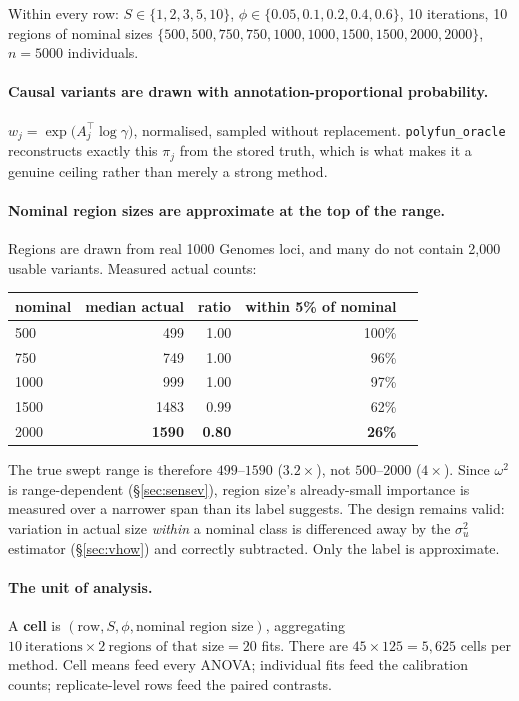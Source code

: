 \documentclass[11pt,a4paper]{article}
\begin{document}
Within every row: $S\in\{1,2,3,5,10\}$, $\phi\in\{0.05,0.1,0.2,0.4,0.6\}$,
10 iterations, 10 regions of nominal sizes
$\{500,500,750,750,1000,1000,1500,1500,2000,2000\}$, $n=5000$ individuals.

\paragraph{Causal variants are drawn with annotation-proportional probability.}
$w_j=\exp\!\big(A_j^\top\log\gamma\big)$, normalised, sampled without
replacement. \texttt{polyfun\_oracle} reconstructs exactly this $\pi_j$ from the
stored truth, which is what makes it a genuine ceiling rather than merely a
strong method.

\paragraph{Nominal region sizes are approximate at the top of the range.}
Regions are drawn from real 1000 Genomes loci, and many do not contain 2{,}000
usable variants. Measured actual counts:

\begin{center}\small
\begin{tabular}{lrrrr}\toprule
nominal & median actual & ratio & within 5\% of nominal\\\midrule
500  & 499  & 1.00 & 100\%\\
750  & 749  & 1.00 & 96\%\\
1000 & 999  & 1.00 & 97\%\\
1500 & 1483 & 0.99 & 62\%\\
2000 & \textbf{1590} & \textbf{0.80} & \textbf{26\%}\\
\bottomrule\end{tabular}\end{center}

The true swept range is therefore $499$--$1590$ ($3.2\times$), not
$500$--$2000$ ($4\times$). Since $\omega^2$ is range-dependent
(\S\ref{sec:sensev}), region size's already-small importance is measured over a
narrower span than its label suggests. The design remains valid: variation in
actual size \emph{within} a nominal class is differenced away by the
$\sigma^2_u$ estimator (\S\ref{sec:vhow}) and correctly subtracted. Only the
label is approximate.

\paragraph{The unit of analysis.} A \textbf{cell} is
$(\text{row},S,\phi,\text{nominal region size})$, aggregating
$10\ \text{iterations}\times2\ \text{regions of that size}=20$ fits. There are
$45\times125=5{,}625$ cells per method. Cell means feed every ANOVA;
individual fits feed the calibration counts; replicate-level rows feed the
paired contrasts.
\end{document}

